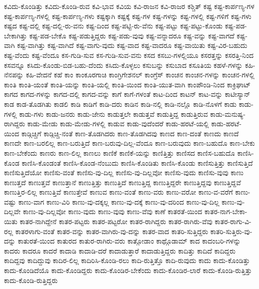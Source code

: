 {ಕವಿದು-ಕೊಂಡಿತ್ತು
ಕವಿದು-ಕೊಂಡಿ-ರುವ
ಕವಿ-ಭಾವ
ಕವಿಯ
ಕವಿ-ರಾಜನ
ಕವಿ-ರಾಜರ
ಕಶ್ಚಿತ್
ಕಷ್ಟ
ಕಷ್ಟ-ಕಾರ್ಪಣ್ಯ-ಗಳ
ಕಷ್ಟ-ಕಾರ್ಪಣ್ಯ-ಗಳಲ್ಲಿ
ಕಷ್ಟ-ಕಾರ್ಪಣ್ಯ-ಗಳು
ಕಷ್ಟಕ್ಕಾಗಿ
ಕಷ್ಟಕ್ಕೆ
ಕಷ್ಟ-ಗಳ
ಕಷ್ಟ-ಗಳನ್ನು
ಕಷ್ಟ-ಗಳಲ್ಲಿ
ಕಷ್ಟ-ಗಳಿಗೆ
ಕಷ್ಟ-ಗಳು
ಕಷ್ಟದ
ಕಷ್ಟ-ದಲ್ಲಿ
ಕಷ್ಟ-ದಲ್ಲಿ-ರು-ವನು
ಕಷ್ಟ-ದಿಂದ
ಕಷ್ಟ-ಪಟ್ಟಿ-ರು-ವೆನು
ಕಷ್ಟ-ಪಟ್ಟು
ಕಷ್ಟ-ಪಟ್ಟು-ಕೊಂಡು
ಕಷ್ಟ-ಪಡ-ಬೇಕಾಗಿತ್ತು
ಕಷ್ಟ-ಪಡ-ಬೇಕೊ
ಕಷ್ಟ-ಪಡುತ್ತಿದ್ದರು
ಕಷ್ಟ-ಪಡು-ವುವು
ಕಷ್ಟ-ವನ್ನಾದರೂ
ಕಷ್ಟ-ವನ್ನು
ಕಷ್ಟ-ವಾಗದೆ
ಕಷ್ಟ-ವಾಗಿ
ಕಷ್ಟ-ವಾಗಿತ್ತು
ಕಷ್ಟ-ವಾಗಿದೆ
ಕಷ್ಟ-ವಾಗು-ವುದು
ಕಷ್ಟ-ವಾದ
ಕಷ್ಟ-ವಾದರೂ
ಕಷ್ಟ-ವಾಯಿತು
ಕಷ್ಟ-ವಿರ-ಬಹುದು
ಕಷ್ಟ-ವೆಂದು
ಕಷ್ಟ-ವೆಂದೂ
ಕಸ-ಗುಡಿ-ಸುವ
ಕಸ-ಗುಡಿ-ಸುವ-ವನು
ಕಸದ
ಕಸಬು-ಗಳಲ್ಲಿಯೂ
ಕಸರತ್ತನ್ನು
ಕಸರತ್ತಿ-ನಿಂದ
ಕಸವನ್ನೂ
ಕಸಿದು-ಕೊಂಡು-ಬಿಡ-ಬಹು-ದೆಂದು
ಕಸಿದು-ಕೊಳ್ಳಲು
ಕಸುಬನ್ನು
ಕಸುಬಾದ
ಕಸೂತಿಯ
ಕಹಳೆ-ಗಳನ್ನು
ಕಹಿ-ನೆನಪನ್ನು
ಕಹಿ-ವೇದನೆ
ಕಹೆ
ಕಾಂ
ಕಾಂಕೂರಗಾಚಿ
ಕಾಂಗ್ರಿಗೇಶನಲ್
ಕಾಂಗ್ರೆಸ್
ಕಾಂಚನ
ಕಾಂಚನ-ಗಳನ್ನು
ಕಾಂಚನ-ಗಳಲ್ಲಿ
ಕಾಂತಿ
ಕಾಂತಿ-ಯಂತೆ
ಕಾಂತಿ-ಯನ್ನು
ಕಾಂತಿ-ಯಲ್ಲಿ
ಕಾಂತಿ-ಯಿಂದ
ಕಾಂತಿ-ಯುತ-ವಾಗಿ
ಕಾಂಪೌಂಡಿ-ನಿಂದ
ಕಾಕ್ರಿಘಾಟ್
ಕಾಗದ
ಕಾಗದ-ಗಳನ್ನು
ಕಾಗದ-ದಲ್ಲಿ
ಕಾಗದ-ವನ್ನು
ಕಾಗೆ
ಕಾಗೆ-ಗಳಂತೆ
ಕಾಟ-ದಿಂದ
ಕಾಟನ್
ಕಾಟ-ವನ್ನು
ಕಾಟೀಸ್ಯಾನ್
ಕಾಡ
ಕಾಡ-ತೊಡಗಿತು
ಕಾಡಲಿ
ಕಾಡಿ
ಕಾಡಿಗೆ
ಕಾಡಿ-ದರು
ಕಾಡಿನ
ಕಾಡಿ-ನಲ್ಲಿ
ಕಾಡಿ-ನಲ್ಲೊ
ಕಾಡಿ-ನೊಳಗೆ
ಕಾಡು
ಕಾಡು-ಗಳಲ್ಲಿ
ಕಾಡು-ಗಳು
ಕಾಡು-ಜನರು
ಕಾಡು-ಜೇನು
ಕಾಡುತ್ತಲೇ
ಕಾಡುತ್ತವೆ
ಕಾಡುತ್ತಿದ್ದ
ಕಾಡುತ್ತಿರುವ
ಕಾಡು-ಮನುಷ್ಯ-ರಾಗಿದ್ದರು
ಕಾಡು-ಮೇಡು
ಕಾಡು-ಮೇಡು-ಗಳಲ್ಲಿ
ಕಾಡುವ
ಕಾಡು-ವುದೆಂದರೆ
ಕಾಡು-ಹರಟೆ-ಯಲ್ಲಿ
ಕಾಡು-ಹರಟೆ-ಯಿಂದ
ಕಾಡ್ಗಿಚ್ಚಿಗೆ
ಕಾಡ್ಗಿಚ್ಚಿ-ನಂತೆ
ಕಾಣ-ತೊಡಗಿದರು
ಕಾಣ-ತೊಡಗಿದವು
ಕಾಣದ
ಕಾಣ-ದಂತೆ
ಕಾಣದು
ಕಾಣದೆ
ಕಾಣದೇ
ಕಾಣ-ಬರಲಿಲ್ಲ
ಕಾಣ-ಬರುತ್ತಿದೆ
ಕಾಣ-ಬರುವು-ದಿಲ್ಲ-ವೆಂದೂ
ಕಾಣ-ಬರುವುದು
ಕಾಣ-ಬಹುದೊ
ಕಾಣ-ಬೇಕು
ಕಾಣ-ಬೇಕೆಂದು
ಕಾಣರು
ಕಾಣ-ಲಿಲ್ಲ
ಕಾಣಲು
ಕಾಣಿಕೆ
ಕಾಣಿಕೆ-ಯನ್ನು
ಕಾಣಿತ್ತಿತ್ತು
ಕಾಣಿಸದ
ಕಾಣಿಸ-ಬಹುದೊ
ಕಾಣಿಸಿ-ಕೊಂಡ
ಕಾಣಿಸಿ-ಕೊಂಡಂತೆ
ಕಾಣಿಸಿ-ಕೊಂಡ-ನೆಂಬುದು
ಕಾಣಿಸಿ-ಕೊಂಡಿತು
ಕಾಣಿಸಿ-ಕೊಂಡು
ಕಾಣಿಸುತ್ತಿತ್ತು
ಕಾಣಿಸುತ್ತಿದೆ
ಕಾಣಿಸುತ್ತಿದೆಯೋ
ಕಾಣಿಸು-ವಂತೆ
ಕಾಣಿಸು-ವು-ದಿಲ್ಲ
ಕಾಣಿಸು-ವು-ದಿಲ್ಲವೋ
ಕಾಣಿಸು-ವುದು
ಕಾಣಿಸು-ವುವು
ಕಾಣು
ಕಾಣುತ್ತದೆ
ಕಾಣುತ್ತವೆ
ಕಾಣುತ್ತಾನೆ
ಕಾಣುತ್ತಿತ್ತು
ಕಾಣುತ್ತಿದೆ
ಕಾಣುತ್ತಿದ್ದ
ಕಾಣುತ್ತಿದ್ದರೇ
ಕಾಣುತ್ತಿದ್ದವು
ಕಾಣುತ್ತಿದ್ದವೆ
ಕಾಣುತ್ತಿರ-ಲಿಲ್ಲ
ಕಾಣುತ್ತಿವೆ
ಕಾಣುತ್ತೇವೆ
ಕಾಣುವ
ಕಾಣು-ವಂತೆ
ಕಾಣು-ವರು
ಕಾಣು-ವರೋ
ಕಾಣು-ವ-ವರೆಗೆ
ಕಾಣು-ವಷ್ಟು
ಕಾಣು-ವಾಗ
ಕಾಣು-ವಿರಿ
ಕಾಣು-ವು-ದಕ್ಕಲ್ಲ
ಕಾಣು-ವು-ದಕ್ಕೆ
ಕಾಣು-ವು-ದರಿಂದ
ಕಾಣು-ವು-ದಿಲ್ಲ
ಕಾಣು-ವು-ದಿಲ್ಲವೇ
ಕಾಣು-ವು-ದಿಲ್ಲವೋ
ಕಾಣು-ವುದು
ಕಾಣು-ವುವು
ಕಾಣು-ವೆವು
ಕಾಣೆ
ಕಾತರತೆ-ಯಿಂದ
ಕಾತರ-ನಾಗ-ಬೇಕಾ-ಯಿತು
ಕಾತರ-ನಾಗಿದ್ದೇನೆ
ಕಾತರ-ಪಟ್ಟರು
ಕಾತರ-ಪಟ್ಟರೋ
ಕಾತರ-ರಾಗಿದ್ದರು
ಕಾತರ-ರಾಗಿರು-ವೆವು
ಕಾತರ-ರಾಗು-ವಿ-ರಲ್ಲ
ಕಾತರಳಾಗು-ವಂತೆ
ಕಾತರ-ವನ್ನು
ಕಾತರ-ವಾಗಿರು-ವು-ದನ್ನು
ಕಾತರ-ವಾದ
ಕಾತರಿ-ಸುತ್ತಿದ್ದರು
ಕಾತರಿ-ಸುತ್ತಿರು-ವು-ದನ್ನು
ಕಾತುರತೆ-ಯಿಂದ
ಕಾತುರದ
ಕಾತುರ-ರಾಗಿರು-ವರು
ಕಾತ್ಗೋಡಾಂ
ಕಾಥ್ಗೊಡಾಮ್
ಕಾದ
ಕಾದಂಬರಿ-ಗಳನ್ನು
ಕಾದರು
ಕಾದರೂ
ಕಾದರೆ
ಕಾದಾಡಿ
ಕಾದಾಡಿ-ದರೆ
ಕಾದಾಡುತ್ತಾರೆ
ಕಾದಾಡುತ್ತಿದ್ದರು
ಕಾದಿತ್ತು
ಕಾದಿದೆ
ಕಾದಿದ್ದರು
ಕಾದಿದ್ದವು
ಕಾದಿದ್ದುವು
ಕಾದಿರ-ಲಿಲ್ಲ
ಕಾದಿರಿಸಿ-ಕೊಂಡಿ-ರಲು
ಕಾದಿ-ರುತ್ತಿತ್ತೊ
ಕಾದಿ-ರುವುದು
ಕಾದು
ಕಾದು-ಕೊಂಡಿತ್ತು
ಕಾದು-ಕೊಂಡಿದೆಯೊ
ಕಾದು-ಕೊಂಡಿದ್ದರು
ಕಾದು-ಕೊಂಡಿರ-ಬೇಕೆಂದು
ಕಾದು-ಕೊಂಡಿರ-ಲಾರೆ
ಕಾದು-ಕೊಂಡಿ-ರುತ್ತಿತ್ತು
ಕಾದು-ಕೊಂಡಿ-ರುತ್ತಿದ್ದರು
}
